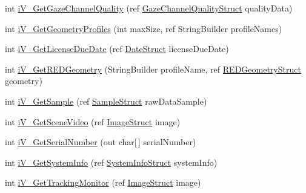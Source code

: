 \begin{DoxyCompactItemize}
\item 
int \hyperlink{class_web_analyzer_1_1_eye_tracking_1_1_eye_tracking_controller_a55e7c694cfac240dec21880cf4211e08}{i\+V\+\_\+\+Get\+Gaze\+Channel\+Quality} (ref \hyperlink{struct_web_analyzer_1_1_eye_tracking_1_1_eye_tracking_controller_1_1_gaze_channel_quality_struct}{Gaze\+Channel\+Quality\+Struct} quality\+Data)
\item 
int \hyperlink{class_web_analyzer_1_1_eye_tracking_1_1_eye_tracking_controller_a8c060ebac5ac946ddff2e620f29df7c4}{i\+V\+\_\+\+Get\+Geometry\+Profiles} (int max\+Size, ref String\+Builder profile\+Names)
\item 
int \hyperlink{class_web_analyzer_1_1_eye_tracking_1_1_eye_tracking_controller_a6d8ef2e3a505e0644282a787edabf169}{i\+V\+\_\+\+Get\+License\+Due\+Date} (ref \hyperlink{struct_web_analyzer_1_1_eye_tracking_1_1_eye_tracking_controller_1_1_date_struct}{Date\+Struct} license\+Due\+Date)
\item 
int \hyperlink{class_web_analyzer_1_1_eye_tracking_1_1_eye_tracking_controller_ab6327f2ec767f0b28b8c8adeae46c00c}{i\+V\+\_\+\+Get\+R\+E\+D\+Geometry} (String\+Builder profile\+Name, ref \hyperlink{struct_web_analyzer_1_1_eye_tracking_1_1_eye_tracking_controller_1_1_r_e_d_geometry_struct}{R\+E\+D\+Geometry\+Struct} geometry)
\item 
int \hyperlink{class_web_analyzer_1_1_eye_tracking_1_1_eye_tracking_controller_a28b9bf251ab6e459336de3b0df324d74}{i\+V\+\_\+\+Get\+Sample} (ref \hyperlink{struct_web_analyzer_1_1_eye_tracking_1_1_eye_tracking_controller_1_1_sample_struct}{Sample\+Struct} raw\+Data\+Sample)
\item 
int \hyperlink{class_web_analyzer_1_1_eye_tracking_1_1_eye_tracking_controller_a4ccb689c360f8426735707c49e8ce89a}{i\+V\+\_\+\+Get\+Scene\+Video} (ref \hyperlink{struct_web_analyzer_1_1_eye_tracking_1_1_eye_tracking_controller_1_1_image_struct}{Image\+Struct} image)
\item 
int \hyperlink{class_web_analyzer_1_1_eye_tracking_1_1_eye_tracking_controller_afa0ba7c26bc79483e441e14dd744e322}{i\+V\+\_\+\+Get\+Serial\+Number} (out char\mbox{[}$\,$\mbox{]} serial\+Number)
\item 
int \hyperlink{class_web_analyzer_1_1_eye_tracking_1_1_eye_tracking_controller_a63193d6f6567dfc18b1d4ffe8675325f}{i\+V\+\_\+\+Get\+System\+Info} (ref \hyperlink{struct_web_analyzer_1_1_eye_tracking_1_1_eye_tracking_controller_1_1_system_info_struct}{System\+Info\+Struct} system\+Info)
\item 
int \hyperlink{class_web_analyzer_1_1_eye_tracking_1_1_eye_tracking_controller_a7bd2298098735109867df49f73a0b562}{i\+V\+\_\+\+Get\+Tracking\+Monitor} (ref \hyperlink{struct_web_analyzer_1_1_eye_tracking_1_1_eye_tracking_controller_1_1_image_struct}{Image\+Struct} image)

\end{DoxyCompactItemize}

